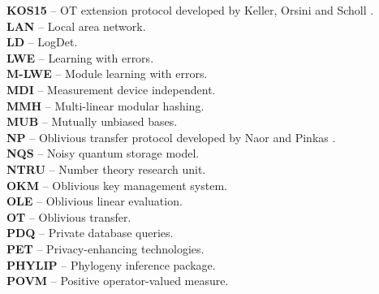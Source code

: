 \textbf{KOS15} -- OT extension protocol developed by Keller, Orsini and Scholl \cite{KOS15}.
\vspace{0.5cm}\\
\textbf{LAN} -- Local area network.
\vspace{0.5cm}\\
\textbf{LD} -- LogDet.
\vspace{0.5cm}\\
\textbf{LWE} -- Learning with errors.
\vspace{0.5cm}\\
\textbf{M-LWE} -- Module learning with errors.
\vspace{0.5cm}\\
\textbf{MDI} -- Measurement device independent.
\vspace{0.5cm}\\
\textbf{MMH} -- Multi-linear modular hashing.
\vspace{0.5cm}\\
\textbf{MUB} -- Mutually unbiased bases.
\vspace{0.5cm}\\
\textbf{NP} -- Oblivious transfer protocol developed by Naor and Pinkas \cite{NP01}.
\vspace{0.5cm}\\
\textbf{NQS} -- Noisy quantum storage model.
\vspace{0.5cm}\\
\textbf{NTRU} -- Number theory research unit.
\vspace{0.5cm}\\
\textbf{OKM} -- Oblivious key management system.
\vspace{0.5cm}\\
\textbf{OLE} -- Oblivious linear evaluation.
\vspace{0.5cm}\\
\textbf{OT} -- Oblivious transfer.
\vspace{0.5cm}\\
\textbf{PDQ} -- Private database queries.
\vspace{0.5cm}\\
\textbf{PET} -- Privacy-enhancing technologies.
\vspace{0.5cm}\\
\textbf{PHYLIP} -- Phylogeny inference package.
\vspace{0.5cm}\\
\textbf{POVM} -- Positive operator-valued measure.
\vspace{0.5cm}\\
